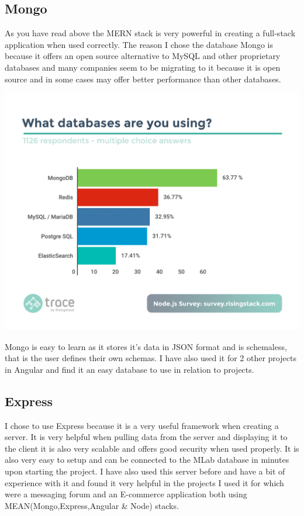 \subsection{Mongo}
As you have read above the MERN stack is very powerful in creating a full-stack
application when used correctly.  The reason I chose the database Mongo is because
it offers an open source alternative to MySQL and other proprietary databases
\cite{Mongo}
and many companies seem to be migrating to it because it is open source and in
some cases may offer better performance than other databases.
\begin{center}
\includegraphics[width=\textwidth]{img/mongostat.png}
\end{center}
\cite{Survey}
Mongo is easy to learn as it stores it's data in JSON format and is schemaless, that is the user
defines their own schemas. I have also used it for 2 other projects in Angular and find it an
easy database to use in relation to projects.
\\
\subsection{Express}
I chose to use Express because it is a very useful framework when creating a server.
It is very helpful when pulling data from the server and displaying it to the client
it is also very scalable and offers good security when used properly.  It is also very
easy to setup and can be connected to the MLab database in minutes upon starting the
project.  I have also used this server before and have a bit of experience with it and
found it very helpful in the projects I used it for which were a messaging forum and an
E-commerce application both using MEAN(Mongo,Express,Angular \& Node) stacks.
\\

